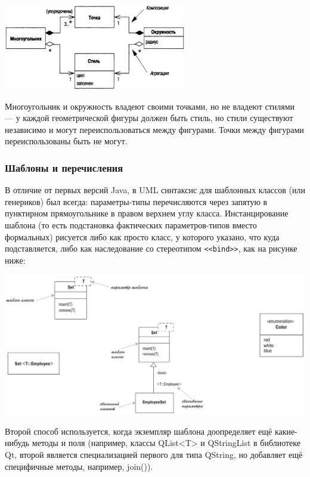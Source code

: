 \documentclass{../text-style}
\begin{document}
\begin{center}
    \includegraphics[width=0.6\textwidth]{aggregationAndCompositionExample.png}
\end{center}

Многоугольник и окружность владеют своими точками, но не владеют стилями --- у каждой геометрической фигуры должен быть стиль, но стили существуют независимо и могут переиспользоваться между фигурами. Точки между фигурами переиспользованы быть не могут.

\subsubsection{Шаблоны и перечисления}

В отличие от первых версий Java, в UML синтаксис для шаблонных классов (или генериков) был всегда: параметры-типы перечисляются через запятую в пунктирном прямоугольнике в правом верхнем углу класса. Инстанцирование шаблона (то есть подстановка фактических параметров-типов вместо формальных) рисуется либо как просто класс, у которого указано, что куда подставляется, либо как наследование со стереотипом \verb|<<bind>>|, как на рисунке ниже:

\begin{center}
    \includegraphics[width=\textwidth]{genericsAndEnums.png}
\end{center}

Второй способ используется, когда экземпляр шаблона доопределяет ещё какие-нибудь методы и поля (например, классы QList<T> и QStringList в библиотеке Qt, второй является специализацией первого для типа QString, но добавляет ещё специфичные методы, например, join()).
\end{document}
